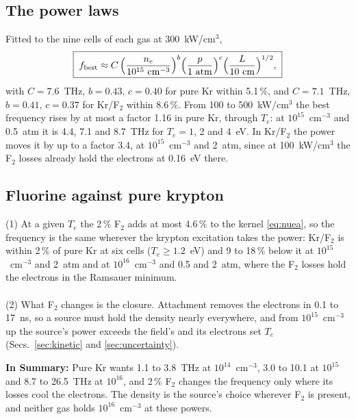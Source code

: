 \documentclass[11pt]{article}
\numberwithin{equation}{section}
\newcommand{\fbest}{f_{\rm best}}
\newcommand{\Te}{T_e}
\begin{document}
\subsection{The power laws}
\label{sec:laws}
Fitted to the nine cells of each gas at 300~kW/cm$^3$,
\begin{equation}
\boxed{\;\fbest\approx C\,\Big(\frac{n_e}{10^{15}~{\rm cm^{-3}}}\Big)^{b}
\Big(\frac{p}{1~{\rm atm}}\Big)^{c}\Big(\frac{L}{10~{\rm cm}}\Big)^{1/2},\;}
\label{eq:law}
\end{equation}
with $C=7.6$~THz, $b=0.43$, $c=0.40$ for pure Kr within 5.1\,\%, and $C=7.1$~THz, $b=0.41$,
$c=0.37$ for Kr/F$_2$ within 8.6\,\%. From 100 to 500~kW/cm$^3$ the best frequency rises by at most a
factor 1.16 in pure Kr, through $\Te$: at $10^{15}$~cm$^{-3}$ and 0.5~atm it is 4.4, 7.1 and
8.7~THz for $\Te=1$, 2 and 4~eV. In Kr/F$_2$ the power moves it by up to a factor 3.4, at
$10^{15}$~cm$^{-3}$ and 2~atm, since at 100~kW/cm$^3$ the F$_2$ losses already hold the
electrons at 0.16~eV there.

\subsection{Fluorine against pure krypton}
\label{sec:f2}
{\noindent}(1) At a given $\Te$ the 2\,\% F$_2$ adds at most 4.6\,\% to the kernel \eqref{eq:nuea}, so
the frequency is the same wherever the krypton excitation takes the power: Kr/F$_2$ is within 2\,\%
of pure Kr at six cells ($\Te\ge1.2$~eV) and 9 to 18\,\% below it at $10^{15}$~cm$^{-3}$ and 2~atm and
at $10^{16}$~cm$^{-3}$ and 0.5 and 2~atm, where the F$_2$ losses hold the electrons in the Ramsauer
minimum.
\\ \\
{\noindent}(2) What F$_2$ changes is the closure. Attachment removes the electrons in 0.1 to 17~ns,
so a source must hold the density nearly everywhere, and from $10^{15}$~cm$^{-3}$ up the source's
power exceeds the field's and its electrons set $\Te$ (Secs.~\ref{sec:kinetic} and
\ref{sec:uncertainty}).

\medskip
\noindent\textbf{In Summary:} Pure Kr wants 1.1 to 3.8~THz at $10^{14}$~cm$^{-3}$, 3.0 to
10.1 at $10^{15}$ and 8.7 to 26.5~THz at $10^{16}$, and 2\,\% F$_2$ changes the frequency only where
its losses cool the electrons. The density is the source's choice wherever F$_2$ is present, and
neither gas holds $10^{16}$~cm$^{-3}$ at these powers.


\end{document}
